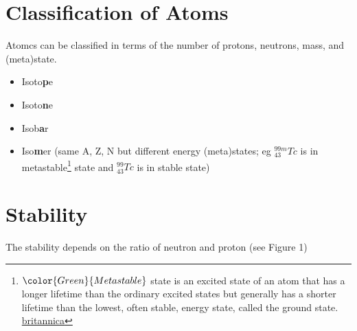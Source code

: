 \documentclass[]{book}
\providecommand{\tightlist}{%
  \setlength{\itemsep}{0pt}\setlength{\parskip}{0pt}}
\let\rmarkdownfootnote\footnote%
\def\footnote{\protect\rmarkdownfootnote}
\theoremstyle{definition}
\theoremstyle{definition}
\theoremstyle{definition}
\theoremstyle{remark}
\begin{document}
\section{Classification of Atoms}\label{classification-of-atoms}

Atomcs can be classified in terms of the number of protons, neutrons,
mass, and (meta)state.

\begin{itemize}
\tightlist
\item
  Isoto\textbf{p}e
\item
  Isoto\textbf{n}e
\item
  Isob\textbf{a}r
\item
  Iso\textbf{m}er (same A, Z, N but different energy (meta)states; eg
  \(_{43}^{99m}Tc\) is in metastable\footnote{\(\color{Green}{Metastable}\)
    state is an excited state of an atom that has a longer lifetime than
    the ordinary excited states but generally has a shorter lifetime
    than the lowest, often stable, energy state, called the ground
    state.
    \href{https://www.britannica.com/science/metastable-state}{britannica}}
  state and \(^{99}_{43}Tc\) is in stable state)
\end{itemize}

\section{Stability}\label{stability}

The stability depends on the ratio of neutron and proton (see Figure 1)
\end{document}

